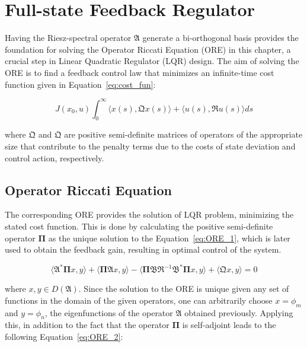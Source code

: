 \section{Full-state Feedback Regulator}

Having the Riesz-spectral operator $\mathfrak{A}$ generate a bi-orthogonal basis provides the foundation for solving the Operator Riccati Equation (ORE) in this chapter, a crucial step in Linear Quadratic Regulator (LQR) design. The aim of solving the ORE is to find a feedback control law that minimizes an infinite-time cost function given in Equation~\ref{eq:cost_fun}:

\begin{equation} \label{eq:cost_fun}
    J(x_0, u) \int_0^{\infty} \langle x(s), \mathfrak{Q} x(s)\rangle + \langle u(s), \mathfrak{R} u(s)\rangle ds
\end{equation}

where $\mathfrak{Q}$ and $\mathfrak{Q}$ are positive semi-definite matrices of operators of the appropriate size that contribute to the penalty terms due to the costs of state deviation and control action, respectively.

\subsection{Operator Riccati Equation}

The corresponding ORE provides the solution of LQR problem, minimizing the stated cost function. This is done by calculating the positive semi-definite operator $\mathbf{\Pi}$ as the unique solution to the Equation~\ref{eq:ORE_1}, which is later used to obtain the feedback gain, resulting in optimal control of the system.

\begin{equation} \label{eq:ORE_1}
    \langle \mathfrak{A}^* \mathbf{\Pi} x, y\rangle + \langle \mathbf{\Pi} \mathfrak{A} x, y \rangle - \langle \mathbf{\Pi} \mathfrak{B} \mathfrak{R}^{-1} \mathfrak{B}^* \mathbf{\Pi} x, y\rangle + \langle \mathfrak{Q} x, y\rangle = 0
\end{equation}

where $x,y \in D(\mathfrak{A})$. Since the solution to the ORE is unique given any set of functions in the domain of the given operators, one can arbitrarily choose $x = \phi_m$ and $y = \phi_n$, the eigenfunctions of the operator $\mathfrak{A}$ obtained previously. Applying this, in addition to the fact that the operator $\mathbf{\Pi}$ is self-adjoint leads to the following Equation~\ref{eq:ORE_2}:

